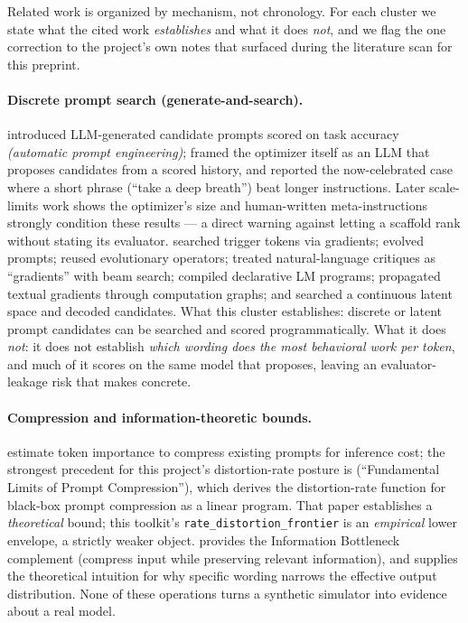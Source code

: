 Related work is organized by mechanism, not chronology. For each cluster we
state what the cited work \emph{establishes} and what it does \emph{not}, and we
flag the one correction to the project's own notes that surfaced during the
literature scan for this preprint.
\label{sec:rel}

\paragraph{Discrete prompt search (generate-and-search).} \citet{zhou2023ape}
introduced LLM-generated candidate prompts scored on task accuracy
\emph{(automatic prompt engineering)}; \citet{yang2023opro} framed the optimizer
itself as an LLM that proposes candidates from a scored history, and reported the
now-celebrated case where a short phrase (``take a deep breath'')
beat longer instructions. Later scale-limits work \citep{zhang2024reoprolim} shows
the optimizer's size and human-written meta-instructions strongly condition these
results --- a direct warning against letting a scaffold rank without stating its
evaluator. \citet{shin2020autoprompt} searched trigger tokens via gradients;
\citet{fernando2023promptbreeder} evolved prompts; \citet{guo2023evoprompt}
reused evolutionary operators; \citet{pryzant2023protegi} treated natural-language
critiques as ``gradients'' with beam search; \citet{khattab2023dspy} compiled
declarative LM programs; \citet{yuksekgonul2024textgrad} propagated textual
gradients through computation graphs; and \citet{latentprompt2025} searched a
continuous latent space and decoded candidates. What this cluster establishes:
discrete or latent prompt candidates can be searched and scored programmatically.
What it does \emph{not}: it does not establish \emph{which wording does the most
behavioral work per token}, and much of it scores on the same model that proposes,
leaving an evaluator-leakage risk that \citet{zhang2024reoprolim} makes concrete.

\paragraph{Compression and information-theoretic bounds.}
\citet{jiang2023llmlingua} estimate token importance to compress existing prompts
for inference cost; the strongest precedent for this project's distortion-rate
posture is \citet{nagle2024promptrates} (``Fundamental Limits of Prompt
Compression''), which derives the distortion-rate function for black-box prompt
compression as a linear program. That paper establishes a \emph{theoretical}
bound; this toolkit's \texttt{rate\_distortion\_frontier} is an \emph{empirical}
lower envelope, a strictly weaker object. \citet{tishby2000ib} provides the
Information Bottleneck complement (compress input while preserving relevant
information), and \citet{xie2021icl} supplies the theoretical intuition for why
specific wording narrows the effective output distribution. None of these
operations turns a synthetic simulator into evidence about a real model.

